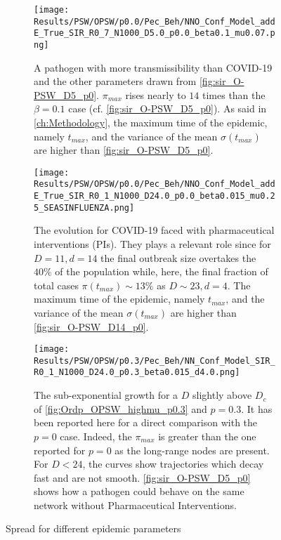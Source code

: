 \documentclass[a4paper,10pt,twoside]{book} %
\theoremstyle{definition}
\begin{document}
\begin{figure}[htbp]
	\centering
	\begin{subfigure}{\linewidth}
		\centering
		\texttt{[image: Results/PSW/OPSW/p0.0/Pec\_Beh/NNO\_Conf\_Model\_addE\_True\_SIR\_R0\_7\_N1000\_D5.0\_p0.0\_beta0.1\_mu0.07.png]}
		\caption{A pathogen with more transmissibility than COVID-19 and the other parameters drawn from \autoref{fig:sir_O-PSW_D5_p0}. $\pi_{max}$ rises nearly to $ 14$ times than the $ \beta = 0.1$ case (cf. \autoref{fig:sir_O-PSW_D5_p0}). As said in \autoref{ch:Methodology}, the maximum time of the epidemic, namely $t_{max} $, and the variance of the mean $\sigma(t_{max})$ are higher than \autoref{fig:sir_O-PSW_D5_p0}.}
		\label{fig:sir_O-PSW_D5_d14_b0.1}
	\end{subfigure}
	\vfill
	\begin{subfigure}[t]{\linewidth}
		\centering
		\texttt{[image: Results/PSW/OPSW/p0.0/Pec\_Beh/NNO\_Conf\_Model\_addE\_True\_SIR\_R0\_1\_N1000\_D24.0\_p0.0\_beta0.015\_mu0.25\_SEASINFLUENZA.png]}
		\caption{The evolution for COVID-19 faced with pharmaceutical interventions (PIs). They plays a relevant role since for $ D = 11, d = 14$ the final outbreak size overtakes the $40 \% $ of the population while, here, the final fraction of total cases $\pi(t_{max})\sim 13\%$ as $D \sim 23, d = 4$. The maximum time of the epidemic, namely $t_{max} $, and the variance of the mean $\sigma(t_{max})$ are higher than \autoref{fig:sir_O-PSW_D14_p0}.}
		\label{fig:sir_O-PSW_D24_d4}
	\end{subfigure}
	\vfill
	\begin{subfigure}{\linewidth}
		\centering
		\texttt{[image: Results/PSW/OPSW/p0.3/Pec\_Beh/NN\_Conf\_Model\_SIR\_R0\_1\_N1000\_D24.0\_p0.3\_beta0.015\_d4.0.png]}
		\caption{The sub-exponential growth for a $D$ slightly above $D_c$ of \autoref{fig:Ordp_OPSW_highmu_p0.3} and $p = 0.3.$ It has been reported here for a direct comparison with the $p = 0$ case. Indeed, the $ \pi_{max} $ is greater than the one reported for $ p= 0$ as the long-range nodes are present. For $ D < 24$, the curves show trajectories which decay fast and are not smooth. \autoref{fig:sir_O-PSW_D5_p0} shows how a pathogen could behave on the same network without Pharmaceutical Interventions.}
		\label{fig:sir_O-PSW_D24_d4_p0.3}
	\end{subfigure}
	\caption{Spread for different epidemic parameters}
	\label{fig:OPSW_COVID_p0.3}
\end{figure}
\end{document}
